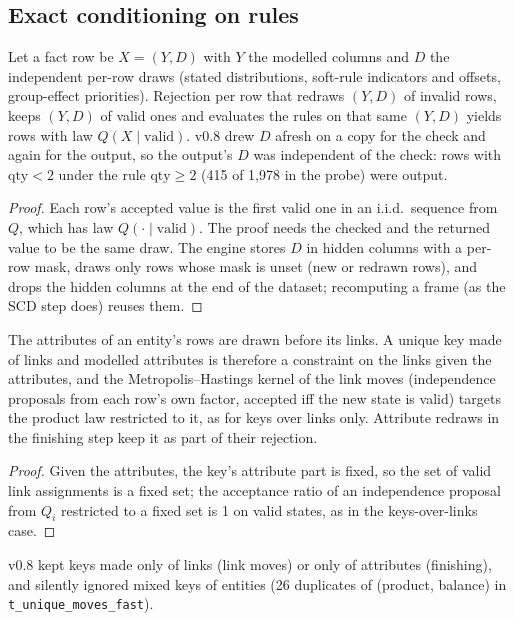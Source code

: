 \subsection{Exact conditioning on rules}
\begin{proposition}\label{prop:hidden}
Let a fact row be $X=(Y,D)$ with $Y$ the modelled columns and $D$ the independent per-row draws (stated distributions, soft-rule indicators and offsets, group-effect priorities). Rejection per row that redraws $(Y,D)$ of invalid rows, keeps $(Y,D)$ of valid ones and evaluates the rules on that same $(Y,D)$ yields rows with law $Q(X\mid\text{valid})$. v0.8 drew $D$ afresh on a copy for the check and again for the output, so the output's $D$ was independent of the check: rows with $\mathrm{qty}<2$ under the rule $\mathrm{qty}\ge2$ (415 of 1{,}978 in the probe) were output.
\end{proposition}
\begin{proof}
Each row's accepted value is the first valid one in an i.i.d.\ sequence from $Q$, which has law $Q(\cdot\mid\text{valid})$. The proof needs the checked and the returned value to be the same draw. The engine stores $D$ in hidden columns with a per-row mask, draws only rows whose mask is unset (new or redrawn rows), and drops the hidden columns at the end of the dataset; recomputing a frame (as the SCD step does) reuses them.
\end{proof}

\begin{proposition}\label{prop:mixedkeys}
The attributes of an entity's rows are drawn before its links. A unique key made of links and modelled attributes is therefore a constraint on the links given the attributes, and the Metropolis--Hastings kernel of the link moves (independence proposals from each row's own factor, accepted iff the new state is valid) targets the product law restricted to it, as for keys over links only. Attribute redraws in the finishing step keep it as part of their rejection.
\end{proposition}
\begin{proof}
Given the attributes, the key's attribute part is fixed, so the set of valid link assignments is a fixed set; the acceptance ratio of an independence proposal from $Q_i$ restricted to a fixed set is 1 on valid states, as in the keys-over-links case.
\end{proof}
\noindent v0.8 kept keys made only of links (link moves) or only of attributes (finishing), and silently ignored mixed keys of entities (26 duplicates of (product, balance) in \texttt{t\_unique\_moves\_fast}).

